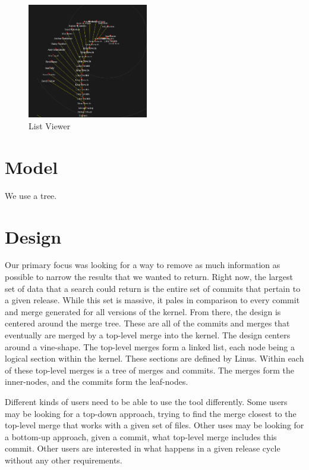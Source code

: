 \documentclass[conference, draftclsnofoot]{IEEEtran}
\begin{document}
\begin{figure}[h!]
	\centering
	\includegraphics[width=0.47\textwidth]{figures/gitvis.png}
	\caption{List Viewer}
	\label{fig:listviewer}
\end{figure}

\section{Model}

We use a tree.


\section{Design}

Our primary focus was looking for a way to remove as much information as
possible to narrow the results that we wanted to return. Right now, the largest
set of data that a search could return is the entire set of commits that
pertain to a given release. While this set is massive, it pales in comparison
to every commit and merge generated for all versions of the kernel. From there,
the design is centered around the merge tree. These are all of the commits and
merges that eventually are merged by a top-level merge into the kernel. The
design centers around a vine-shape. The top-level merges form a linked list,
each node being a logical section within the kernel. These sections are defined
by Linus. Within each of these top-level merges is a tree of merges and
commits. The merges form the inner-nodes, and the commits form the leaf-nodes.



Different kinds of users need to be able to use the tool differently.
Some users may be looking for a top-down approach, trying to find the merge
closest to the top-level merge that works with a given set of files. Other uses
may be looking for a bottom-up approach, given a commit, what top-level merge
includes this commit. Other users are interested in what happens in a given
release cycle without any other requirements.
\end{document}
